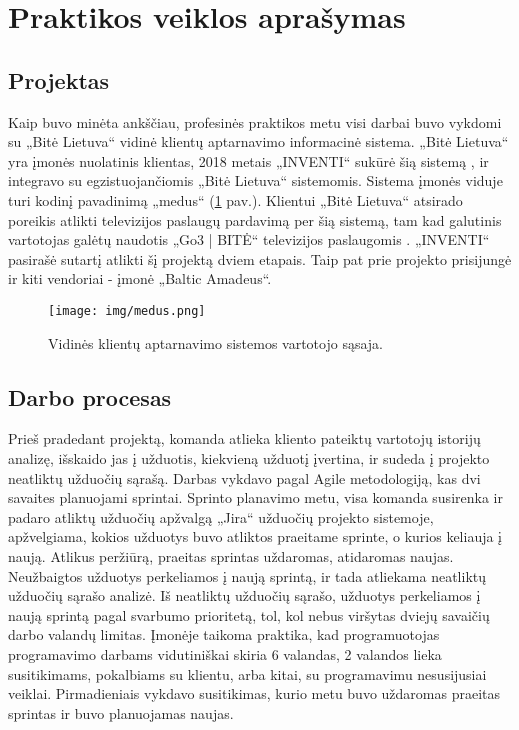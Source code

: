 \section{Praktikos veiklos aprašymas}

\subsection{Projektas}
Kaip buvo minėta ankščiau, profesinės praktikos metu visi darbai buvo vykdomi su „Bitė Lietuva“ vidinė klientų aptarnavimo informacinė sistema.
„Bitė Lietuva“ yra įmonės nuolatinis klientas, 2018 metais „INVENTI“ sukūrė šią sistemą \cite{medus}, ir integravo su egzistuojančiomis „Bitė Lietuva“ sistemomis.
Sistema įmonės viduje turi kodinį pavadinimą „medus“ (\ref{img:medus} pav.).
Klientui „Bitė Lietuva“ atsirado poreikis atlikti televizijos paslaugų pardavimą per šią sistemą, tam kad galutinis vartotojas galėtų naudotis
„Go3 | BITĖ“ televizijos paslaugomis \cite{go3}. „INVENTI“ pasirašė sutartį atlikti šį projektą dviem etapais.
Taip pat prie projekto prisijungė ir kiti vendoriai - įmonė „Baltic Amadeus“.


\begin{figure}[H]
    \centering
    \texttt{[image: img/medus.png]}
    \caption{Vidinės klientų aptarnavimo sistemos vartotojo sąsaja.}
    \label{img:medus}
\end{figure}

\subsection{Darbo procesas}
Prieš pradedant projektą, komanda atlieka kliento pateiktų vartotojų istorijų analizę, išskaido jas į užduotis, kiekvieną užduotį įvertina, ir sudeda į projekto neatliktų užduočių sąrašą.
Darbas vykdavo pagal Agile metodologiją, kas dvi savaites planuojami sprintai. Sprinto planavimo metu, visa komanda susirenka ir padaro atliktų užduočių apžvalgą „Jira“
užduočių projekto sistemoje, apžvelgiama, kokios užduotys buvo atliktos praeitame sprinte, o kurios keliauja į naują.
Atlikus peržiūrą, praeitas sprintas uždaromas, atidaromas naujas. Neužbaigtos užduotys perkeliamos į naują sprintą, ir tada atliekama neatliktų užduočių sąrašo analizė.
Iš neatliktų užduočių sąrašo, užduotys perkeliamos į naują sprintą pagal svarbumo prioritetą, tol, kol nebus viršytas dviejų savaičių darbo valandų limitas. Įmonėje taikoma praktika,
kad programuotojas programavimo darbams vidutiniškai skiria 6 valandas, 2 valandos lieka susitikimams, pokalbiams su klientu, arba kitai, su programavimu nesusijusiai veiklai.
Pirmadieniais vykdavo susitikimas, kurio metu buvo uždaromas praeitas sprintas ir buvo planuojamas naujas.

